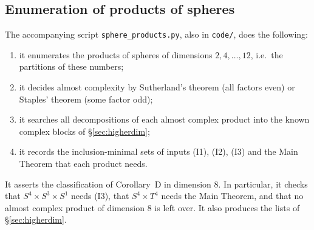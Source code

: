\documentclass{article}
\theoremstyle{definition}
\theoremstyle{plain}
\begin{document}
\subsection{Enumeration of products of spheres}\label{app:spheres}
The accompanying script \texttt{sphere\_products.py}, also in \texttt{code/}, does the
following:
\begin{enumerate}
\item it enumerates the products of spheres of dimensions $2,4,\dots,12$, i.e.\ the
  partitions of these numbers;
\item it decides almost complexity by Sutherland's theorem (all factors even) or
  Staples' theorem (some factor odd);
\item it searches all decompositions of each almost complex product into the known
  complex blocks of \S\ref{sec:higherdim};
\item it records the inclusion-minimal sets of inputs (I1), (I2), (I3) and the Main
  Theorem that each product needs.
\end{enumerate}
It asserts the classification of Corollary~D in dimension $8$. In particular, it checks
that $S^4\times S^3\times S^1$ needs (I3), that $S^4\times T^4$ needs the Main Theorem, and
that no almost complex product of dimension $8$ is left over. It also produces the
lists of \S\ref{sec:higherdim}.

{}

{}
\end{document}
